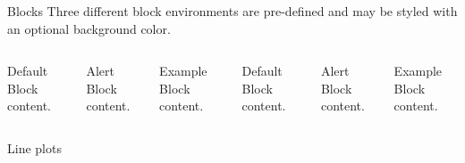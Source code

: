 \begin{frame}{Blocks}
				Three different block environments are pre-defined and may be styled with an
				optional background color.

				\begin{columns}[T,onlytextwidth]
								\begin{block}{Default}
												Block content.
								\end{block}

								\begin{alertblock}{Alert}
												Block content.
								\end{alertblock}

								\begin{exampleblock}{Example}
												Block content.
								\end{exampleblock}



								\begin{block}{Default}
												Block content.
								\end{block}

								\begin{alertblock}{Alert}
												Block content.
								\end{alertblock}

								\begin{exampleblock}{Example}
												Block content.
								\end{exampleblock}

				\end{columns}
\end{frame}
\begin{frame}{Line plots}
				\begin{figure}
				\end{figure}
\end{frame}

